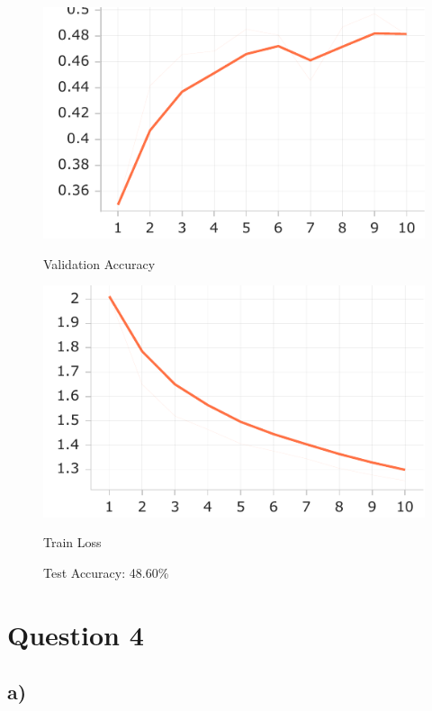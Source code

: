 \documentclass{article}
\begin{document}
\begin{figure}[H]
    \centering
    \begin{minipage}{0.45\textwidth}
        \centering
        \includegraphics[width=\linewidth]{images/torch_nonorm/Accuracy_validation.pdf}
        \caption{Validation Accuracy}
    \end{minipage} \hfill
    \begin{minipage}{0.45\textwidth}
        \centering
        \includegraphics[width=\linewidth]{images/torch_nonorm/Loss_train-2.pdf}
        \caption{Train Loss}
    \end{minipage}
    \caption{Test Accuracy: 48.60\%}
\end{figure}

\newpage
\section*{Question 4}

\subsection*{a)}
\end{document}
